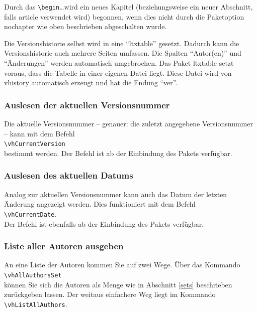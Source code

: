 Durch das \verb|\begin|\ldots wird ein neues Kapitel (beziehungsweise ein neuer Abschnitt, falls article verwendet wird) begonnen, wenn dies nicht durch die Paketoption nochapter wie oben beschrieben abgeschalten wurde.

Die Versionshistorie selbst wird in eine "`ltxtable"' gesetzt. Dadurch kann die Versionshistorie auch mehrere Seiten umfassen. Die Spalten "`Autor(en)"' und "`Änderungen"' werden automatisch umgebrochen. Das Paket ltxtable setzt voraus, dass die Tabelle in einer eigenen Datei liegt. Diese Datei wird von vhistory automatisch erzeugt und hat die Endung "`ver"'.

\subsubsection{Auslesen der aktuellen Versionsnummer}
Die aktuelle Versionsnummer -- genauer: die zuletzt angegebene Versionsnummer -- kann mit dem Befehl\\
\mbox{}\hspace{2em}\verb|\vhCurrentVersion|\\
bestimmt werden. Der Befehl ist ab der Einbindung des Pakets verfügbar.

\subsubsection{Auslesen des aktuellen Datums}
Analog zur aktuellen Versionsnummer kann auch das Datum der letzten Änderung angezeigt werden. Dies funktioniert mit dem Befehl\\
\mbox{}\hspace{2em}\verb|\vhCurrentDate|.\\
Der Befehl ist ebenfalls ab der Einbindung des Pakets verfügbar.

\subsubsection{Liste aller Autoren ausgeben}
An eine Liste der Autoren kommen Sie auf zwei Wege. Über das Kommando\\
\mbox{}\hspace{2em}\verb|\vhAllAuthorsSet|\\
können Sie sich die Autoren als Menge wie in Abschnitt \ref{sets} beschrieben zurückgeben lassen. Der weitaus einfachere Weg liegt im Kommando\\
\mbox{}\hspace{2em}\verb|\vhListAllAuthors|.

